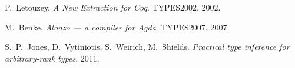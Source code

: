 \begin{thebibliography}{99}

   P.~Letouzey.
   \emph{A New Extraction for Coq}.
   TYPES2002, 2002.

   M.~Benke.
   \emph{Alonzo --- a compiler for Agda}.
   TYPES2007, 2007.

   S.~P.~Jones, D.~Vytiniotis, S.~Weirich, M.~Shields.
   \emph{Practical type inference for arbitrary-rank types}.
   2011.

\end{thebibliography}
